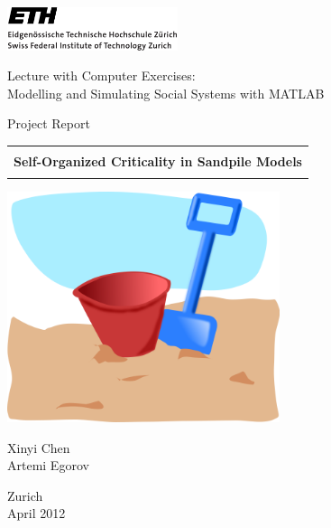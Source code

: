
\thispagestyle{empty}

\begin{center}
\includegraphics[width=5cm]{ETHlogo.png}

\bigskip


\bigskip


\bigskip


\LARGE{ 	Lecture with Computer Exercises:\\ }
\LARGE{ Modelling and Simulating Social Systems with MATLAB\\}

\bigskip

\bigskip

\small{Project Report}\\

\bigskip





\begin{tabular}{|c|}
\hline
\\
\textbf{\LARGE{Self-Organized Criticality in Sandpile Models}}\\
\\
\hline
\end{tabular}
\bigskip

\bigskip

\bigskip

\includegraphics[width=8cm]{addon_bucket_and_spade.png}


\bigskip

\bigskip

\bigskip


\LARGE{Xinyi Chen \\ Artemi Egorov }





\bigskip

\bigskip




Zurich\\
April 2012\\

\end{center}


